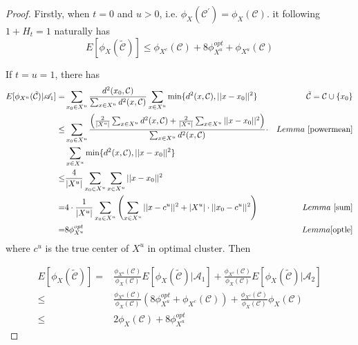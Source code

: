 \begin{lemma}
\begin{proof}
         
         Firstly, when $t = 0$ and $u > 0$, i.e. $\phi_{X}(\mathcal{C}^{'}) = \phi_{X}(\mathcal{C})$. it following $1 + H_{t} = 1$ naturally has  
         \begin{equation}
         E[\phi_{X}(\tilde{\mathcal{C}})] \leq \phi_{X^{c}}(\mathcal{C}) + 8\phi^{opt}_{X^{u}} + \phi_{X^{u}}(\mathcal{C})         
         \end{equation}
         
         If $t = u = 1$, there has 
           \begin{equation}
           \label{eqlemma}
           \begin{aligned}
        E[\phi_{X^{u}}(\tilde{\mathcal{C}})|\mathscr{A}_{1}]   = &\sum_{x_{0} \in X^{u}} \frac{d^{2}(x_{0}, \mathcal{C})}{\sum_{x \in X^{u}} d^{2}(x, \mathcal{C})} \sum_{x \in X^{u}} \min \{d^{2}(x, \mathcal{C}), ||x - x_{0}||^{2}\} & \tilde{\mathcal{C}} = \mathcal{C} \cup \{x_{0}\} \\
          \leq &   \sum_{x_{0} \in X^{u}}\frac{ \left(\frac{2}{|X^{u}|} \sum_{x \in X^{u}}  d^{2}(x, \mathcal{C}) + \frac{2}{|X^{u}|} \sum_{x\in X^{u}} ||x - x_{0}||^{2} \right)}{\sum_{x \in X^{u}} d^{2}(x, \mathcal{C})} \cdot & Lemma\  \ref{powermean}\\
         &\sum_{x \in X^{u}} \min \{d^{2}(x, \mathcal{C}), ||x - x_{0}||^{2}\} \\
         \leq &  \frac{4}{|X^{u}|} \sum_{x_{0} \in X^{u}}  \sum_{x\in X^{u}} ||x-x_{0}||^{2} \\
          = & 4\cdot \frac{1}{|X^{u}|}  \sum_{x_{0} \in X^{u}} \left(\sum_{x\in X^{u}} ||x - c^{u}||^{2} + |X^{u}|\cdot ||x_{0} - c^{u}||^{2}\right)& Lemma \ \ref{sum}\\
          = & 8\phi^{opt}_{X^{u}} & Lemma \ref{optle}
         \end{aligned}   
         \end{equation}
         where $c^{u}$ is the true center of $X^{u}$ in optimal cluster.
         Then 
         
         \begin{equation}\begin{aligned}
          E[\phi_{X}(\tilde{\mathcal{C}})] = &\frac{\phi_{X^{u}}(\mathcal{C})}{\phi_{X}(\mathcal{C})} E[\phi_{X}(\tilde{\mathcal{C}})|\mathscr{A}_{1}] + \frac{\phi_{X^{c}}(\mathcal{C})}{\phi_{X}(\mathcal{C})} E[\phi_{X}(\tilde{\mathcal{C}})|\mathscr{A}_{2}]\\     
          \leq &\frac{\phi_{X^{u}}(\mathcal{C})}{\phi_{X}(\mathcal{C})} \left(8\phi^{opt}_{X^{u}} +\phi_{X^{c}}(\mathcal{C}) \right) + \frac{\phi_{X^{c}}(\mathcal{C})}{\phi_{X}(\mathcal{C})} \phi_{X}(\mathcal{C})\\    
          \leq &  2\phi_{X}(\mathcal{C}) + 8\phi^{opt}_{X^{u}}
          \end{aligned}
         \end{equation}
         

\end{proof}
\end{lemma}

